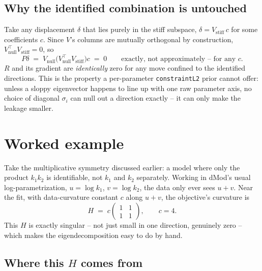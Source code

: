 \documentclass[11pt]{article}
\newcommand{\code}[1]{\texttt{#1}}
\begin{document}
\subsection*{Why the identified combination is untouched}

Take any displacement $\delta$ that lies purely in the stiff subspace,
$\delta = V_{\mathrm{stiff}}\,c$ for some coefficients $c$. Since $V$'s
columns are mutually orthogonal by construction, $V_{\mathrm{null}}^\top
V_{\mathrm{stiff}} = 0$, so
\begin{equation}
  P\delta \;=\; V_{\mathrm{null}}\big(V_{\mathrm{null}}^\top V_{\mathrm{stiff}}\big)c \;=\; 0
  \qquad\text{exactly, not approximately -- for any $c$.}
\end{equation}
$R$ and its gradient are \emph{identically} zero for any move confined to the
identified directions. This is the property a per-parameter
\code{constraintL2} prior cannot offer: unless a sloppy eigenvector happens
to line up with one raw parameter axis, no choice of diagonal $\sigma_i$ can
null out a direction exactly -- it can only make the leakage smaller.

\section{Worked example}

Take the multiplicative symmetry discussed earlier: a model where only the
product $k_1 k_2$ is identifiable, not $k_1$ and $k_2$ separately. Working in
dMod's usual log-parametrization, $u = \log k_1$, $v = \log k_2$, the data
only ever sees $u+v$. Near the fit, with data-curvature constant $c$ along
$u+v$, the objective's curvature is
\begin{equation}
  H \;=\; c\begin{pmatrix}1&1\\1&1\end{pmatrix}, \qquad c = 4.
\end{equation}
This $H$ is exactly singular -- not just small in one direction, genuinely
zero -- which makes the eigendecomposition easy to do by hand.

\subsection*{Where this $H$ comes from}
\end{document}
